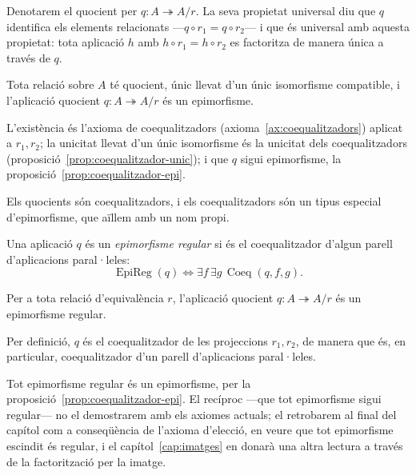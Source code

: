 \begin{notacio}[Quocient]\label{not:quocient}
Denotarem el quocient per \(q\colon A\twoheadrightarrow A/r\). La seva propietat universal diu que \(q\) identifica els elements relacionats ---\(q\circ r_1=q\circ r_2\)--- i que és universal amb aquesta propietat: tota aplicació \(h\) amb \(h\circ r_1=h\circ r_2\) es factoritza de manera única a través de \(q\).
\end{notacio}

\begin{proposicio}\label{prop:quocient-existeix}
Tota relació sobre \(A\) té quocient, únic llevat d'un únic isomorfisme compatible, i l'aplicació quocient \(q\colon A\twoheadrightarrow A/r\) és un epimorfisme.
\end{proposicio}

\begin{prova}
L'existència és l'axioma de coequalitzadors (axioma~\ref{ax:coequalitzadors}) aplicat a \(r_1,r_2\); la unicitat llevat d'un únic isomorfisme és la unicitat dels coequalitzadors (proposició~\ref{prop:coequalitzador-unic}); i que \(q\) sigui epimorfisme, la proposició~\ref{prop:coequalitzador-epi}.
\end{prova}

Els quocients són coequalitzadors, i els coequalitzadors són un tipus especial d'epimorfisme, que aïllem amb un nom propi.

\begin{definicio}\label{def:epi-regular}
Una aplicació \(q\) és un \emph{epimorfisme regular} si és el coequalitzador d'algun parell d'aplicacions paral·leles:
\[
\operatorname{EpiReg}(q)
\iff
\exists f\,\exists g\,\operatorname{Coeq}(q,f,g).
\]
\end{definicio}

\begin{proposicio}\label{prop:quocient-regular}
Per a tota relació d'equivalència \(r\), l'aplicació quocient \(q\colon A\twoheadrightarrow A/r\) és un epimorfisme regular.
\end{proposicio}

\begin{prova}
Per definició, \(q\) és el coequalitzador de les projeccions \(r_1,r_2\), de manera que és, en particular, coequalitzador d'un parell d'aplicacions paral·leles.
\end{prova}

\begin{observacio}\label{obs:regular-escindit}
Tot epimorfisme regular és un epimorfisme, per la proposició~\ref{prop:coequalitzador-epi}. El recíproc ---que tot epimorfisme sigui regular--- no el demostrarem amb els axiomes actuals; el retrobarem al final del capítol com a conseqüència de l'axioma d'elecció, en veure que tot epimorfisme escindit és regular, i el capítol~\ref{cap:imatges} en donarà una altra lectura a través de la factorització per la imatge.
\end{observacio}

